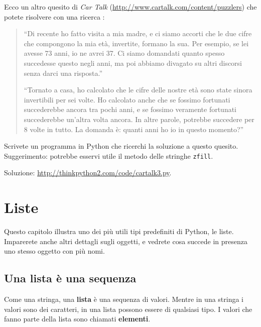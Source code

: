 \documentclass[10pt]{book}
\begin{document}
\vspace{0.2in}
\begin{exercise}
Ecco un altro quesito di {\em Car Talk} (\url{http://www.cartalk.com/content/puzzlers}) che potete risolvere con una ricerca :

\begin{quote}
``Di recente ho fatto visita a mia madre, e ci siamo accorti che le due cifre che compongono la mia età, invertite, formano la sua. Per esempio, se lei avesse 73 anni, io ne avrei 37. Ci siamo domandati quanto spesso succedesse questo negli anni, ma poi abbiamo divagato su altri discorsi senza darci una risposta.''

``Tornato a casa, ho calcolato che le cifre delle nostre età sono state sinora invertibili per sei volte. Ho calcolato anche che se fossimo fortunati succederebbe ancora tra pochi anni, e se fossimo veramente fortunati succederebbe un'altra volta ancora. In altre parole, potrebbe succedere per 8 volte in tutto. La domanda è: quanti anni ho io in questo momento?''

\end{quote}

Scrivete un programma in Python che ricerchi la soluzione a questo quesito. Suggerimento: potrebbe esservi utile il metodo delle stringhe {\tt zfill}.

Soluzione: \url{http://thinkpython2.com/code/cartalk3.py}.

\end{exercise}



\chapter{Liste}

Questo capitolo illustra uno dei più utili tipi predefiniti di Python, le liste. Imparerete anche altri dettagli sugli oggetti, e vedrete cosa succede in presenza uno stesso oggetto con più nomi.

\section{Una lista è una sequenza}
\label{sequence}

Come una stringa, una {\bf lista} è una sequenza di valori. Mentre in una stringa i valori sono dei caratteri, in una lista possono essere di qualsiasi tipo. I valori che fanno parte della lista sono chiamati {\bf elementi}.
\end{document}
